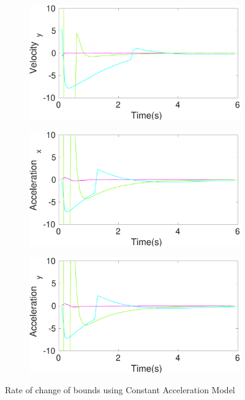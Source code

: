 \begin{figure}[h]
\begin{subfigure}{.5\linewidth}
\end{subfigure}
\begin{subfigure}{.5\linewidth}
\centering
\includegraphics[width=\linewidth]{figures/BoundChange/CA/ca_bound_changeVelocity_y}
\end{subfigure}
\begin{subfigure}{.5\linewidth}
\centering
\includegraphics[width=\linewidth]{figures/BoundChange/CA/ca_bound_changeAcceleration_x}
\end{subfigure}
\begin{subfigure}{.5\linewidth}
\centering
\includegraphics[width=\linewidth]{figures/BoundChange/CA/ca_bound_changeAcceleration_y}
\end{subfigure}
\caption{Rate of change of bounds using Constant Acceleration Model}
\end{figure}

